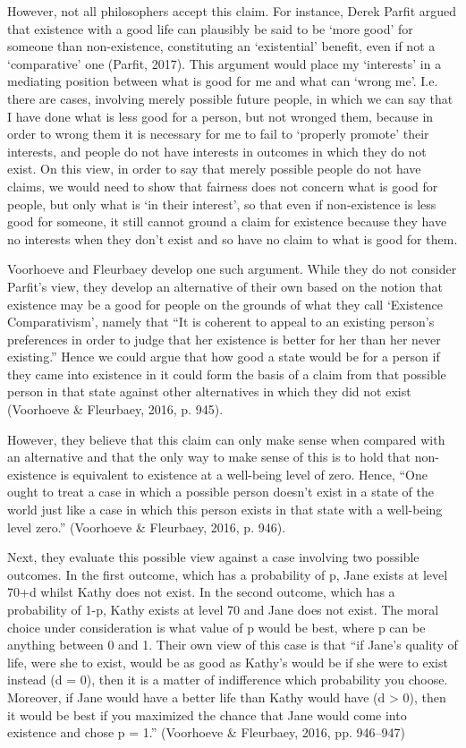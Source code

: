 \documentclass[man,11pt,a4paper]{apa7}
\begin{document}
However, not all philosophers accept this claim. For instance, Derek Parfit argued that existence with a good life can plausibly be said to be `more good' for someone than non-existence, constituting an `existential' benefit, even if not a `comparative' one (Parfit, 2017). This argument would place my `interests' in a mediating position between what is good for me and what can `wrong me'. I.e. there are cases, involving merely possible future people, in which we can say that I have done what is less good for a person, but not wronged them, because in order to wrong them it is necessary for me to fail to `properly promote' their interests, and people do not have interests in outcomes in which they do not exist. On this view, in order to say that merely possible people do not have claims, we would need to show that fairness does not concern what is good for people, but only what is `in their interest', so that even if non-existence is less good for someone, it still cannot ground a claim for existence because they have no interests when they don't exist and so have no claim to what is good for them.

Voorhoeve and Fleurbaey develop one such argument. While they do not consider Parfit's view, they develop an alternative of their own based on the notion that existence may be a good for people on the grounds of what they call `Existence Comparativism', namely that ``It is coherent to appeal to an existing person's preferences in order to judge that her existence is better for her than her never existing.'' Hence we could argue that how good a state would be for a person if they came into existence in it could form the basis of a claim from that possible person in that state against other alternatives in which they did not exist (Voorhoeve \& Fleurbaey, 2016, p. 945).

However, they believe that this claim can only make sense when compared with an alternative and that the only way to make sense of this is to hold that non-existence is equivalent to existence at a well-being level of zero. Hence, ``One ought to treat a case in which a possible person doesn't exist in a state of the world just like a case in which this person exists in that state with a well-being level zero.'' (Voorhoeve \& Fleurbaey, 2016, p. 946).

Next, they evaluate this possible view against a case involving two possible outcomes. In the first outcome, which has a probability of p, Jane exists at level 70+d whilst Kathy does not exist. In the second outcome, which has a probability of 1-p, Kathy exists at level 70 and Jane does not exist. The moral choice under consideration is what value of p would be best, where p can be anything between 0 and 1. Their own view of this case is that ``if Jane's quality of life, were she to exist, would be as good as Kathy's would be if she were to exist instead (d = 0), then it is a matter of indifference which probability you choose. Moreover, if Jane would have a better life than Kathy would have (d > 0), then it would be best if you maximized the chance that Jane would come into existence and chose p = 1.'' (Voorhoeve \& Fleurbaey, 2016, pp. 946--947)
\end{document}
